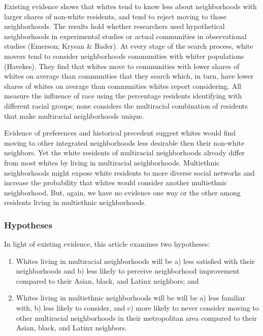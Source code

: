 \documentclass{baderart}
\begin{document}
Existing evidence shows that whites tend to know less about neighborhoods with larger shares of non-white residents, and tend to reject moving to those neighborhoods. The results hold whether researchers used hypothetical neighborhoods in experimental studies or actual communities in observational studies (Emerson; Krysan \& Bader). At every stage of the search process, white movers tend to consider neighborhoods communities with whiter populations (Havekes). They find that whites move to communities with lower shares of whites on average than communities that they search which, in turn, have lower shares of whites on average than communities whites report considering. All measure the influence of race using the percentage residents identifying with different racial groups; none considers the multiracial combination of residents that make multiracial neighborhoods unique.

Evidence of preferences and historical precedent suggest whites would find moving to other integrated neighborhoods less desirable then their non-white neighbors. Yet the white residents of multiracial neighborhoods already differ from most whites by living in multiracial neighborhoods. Multiethnic neighborhoods might expose white residents to more diverse social networks and increase the probability that whites would consider another multiethnic neighborhood. But, again, we have no evidence one way or the other among residents living in multiethnic neighborhoods.

\subsubsection{Hypotheses}\label{hypotheses}

In light of existing evidence, this article examines two hypotheses:


\begin{enumerate} 

\item   Whites living in multiracial neighborhoods will be a) less satisfied  with their neighborhoods and b) less likely to perceive neighborhood  improvement compared to their Asian, black, and Latinx neighbors; and 

\item   Whites living in multiethnic neighborhoods will be will be a) less familiar with, b) less likely to consider, and c) more likely to never consider moving to other multiracial neighborhoods in their metropolitan area compared to their Asian, black, and Latinx neighbors. 

\end{enumerate}
\end{document}
